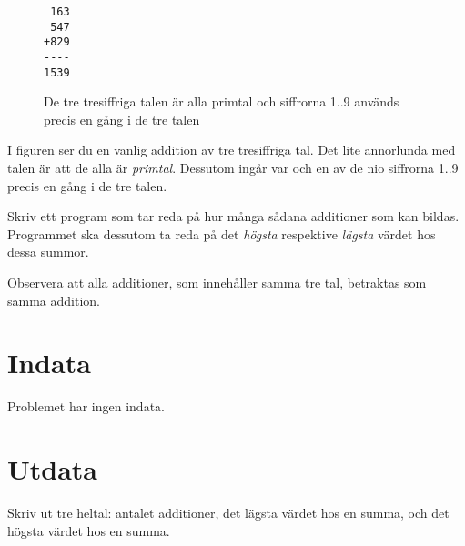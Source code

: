 
\begin{figure}
\centering
\begin{verbatim}
 163
 547
+829
----
1539
\end{verbatim}
\caption{De tre tresiffriga talen är alla primtal och siffrorna 1..9 används precis en gång i de tre talen}
\end{figure}

I figuren ser du en vanlig addition av tre tresiffriga tal. Det lite annorlunda med talen är att de alla är \emph{primtal}. Dessutom ingår var och en 
av de nio siffrorna 1..9 precis en gång i de tre talen.

Skriv ett program som tar reda på hur många sådana additioner som kan bildas. Programmet ska dessutom ta reda på det \emph{högsta} respektive \emph{lägsta}
värdet hos dessa summor.

Observera att alla additioner, som innehåller samma tre tal, betraktas som samma addition.

\section*{Indata}
Problemet har ingen indata.

\section*{Utdata}
Skriv ut tre heltal: antalet additioner, det lägsta värdet hos en summa, och det högsta värdet hos en summa.

